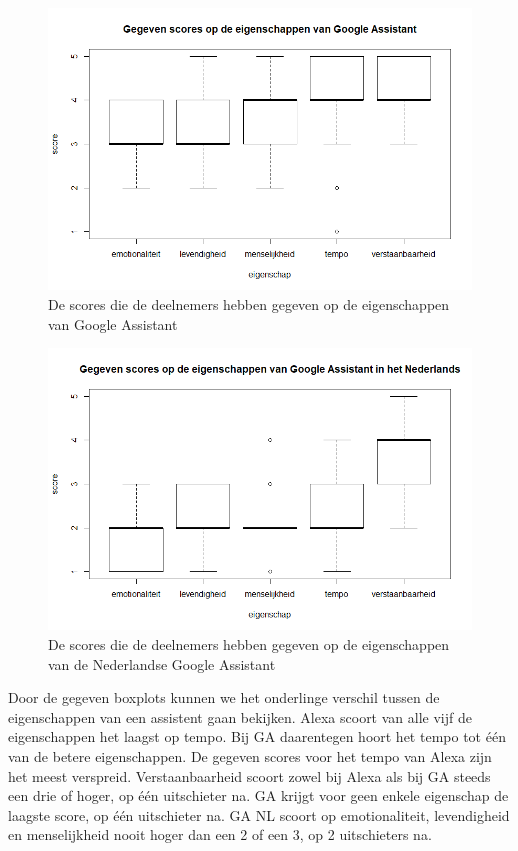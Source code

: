 \begin{figure}[H]
    \centering
    \includegraphics[width=0.9\linewidth]{../onderzoek/onderzoeksresultaten/vergelijking_eigenschappen_per_assistent/boxplot_score_eigenschappen_GA}
    \caption{De scores die de deelnemers hebben gegeven op de eigenschappen van Google Assistant}
    \label{fig:boxplot-ga}
\end{figure}

\begin{figure}[H]
    \centering
    \includegraphics[width=0.9\linewidth]{../onderzoek/onderzoeksresultaten/vergelijking_eigenschappen_per_assistent/boxplot_score_eigenschappen_GA_NL}
    \caption{De scores die de deelnemers hebben gegeven op de eigenschappen van de Nederlandse Google Assistant}
    \label{fig:boxplot-ganl}
\end{figure}

Door de gegeven boxplots kunnen we het onderlinge verschil tussen de eigenschappen van een assistent gaan bekijken. Alexa scoort van alle vijf de eigenschappen het laagst op tempo. Bij \gls{GA} daarentegen hoort het tempo tot één van de betere eigenschappen. De gegeven scores voor het tempo van Alexa zijn het meest verspreid. 
Verstaanbaarheid scoort zowel bij Alexa als bij \gls{GA} steeds een drie of hoger, op één uitschieter na.
\gls{GA} krijgt voor geen enkele eigenschap de laagste score, op één uitschieter na.
\gls{GA NL} scoort op emotionaliteit, levendigheid en menselijkheid nooit hoger dan een 2 of een 3, op 2 uitschieters na.

